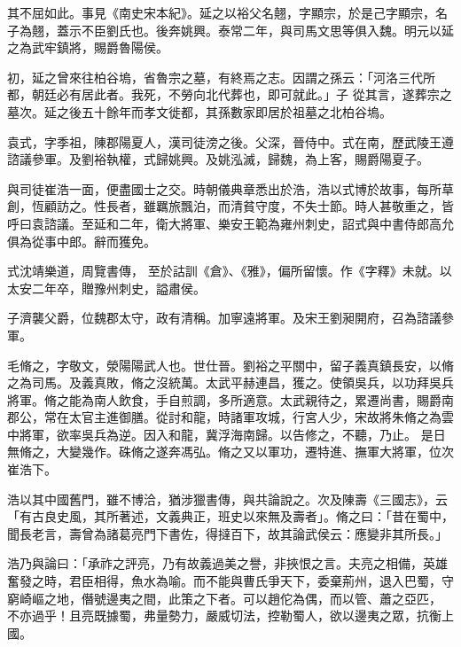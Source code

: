 \begin{pinyinscope}
 其不屈如此。事見《南史宋本紀》。延之以裕父名翹，字顯宗，於是己字顯宗，名子為翹，蓋示不臣劉氏也。後奔姚興。泰常二年，與司馬文思等俱入魏。明元以延之為武牢鎮將，賜爵魯陽侯。



 初，延之曾來往柏谷塢，省魯宗之墓，有終焉之志。因謂之孫云：「河洛三代所都，朝廷必有居此者。我死，不勞向北代葬也，即可就此。」子
 從其言，遂葬宗之墓次。延之後五十餘年而孝文徙都，其孫數家即居於祖墓之北柏谷塢。



 袁式，字季祖，陳郡陽夏人，漢司徒滂之後。父深，晉侍中。式在南，歷武陵王遵諮議參軍。及劉裕執權，式歸姚興。及姚泓滅，歸魏，為上客，賜爵陽夏子。



 與司徒崔浩一面，便盡國士之交。時朝儀典章悉出於浩，浩以式博於故事，每所草創，恆顧訪之。性長者，雖羈旅飄泊，而清貧守度，不失士節。時人甚敬重之，皆呼曰袁諮議。至延和二年，衛大將軍、樂安王範為雍州刺史，詔式與中書侍郎高允俱為從事中郎。辭而獲免。



 式沈靖樂道，周覽書傳，
 至於詁訓《倉》、《雅》，偏所留懷。作《字釋》未就。以太安二年卒，贈豫州刺史，謚肅侯。



 子濟襲父爵，位魏郡太守，政有清稱。加寧遠將軍。及宋王劉昶開府，召為諮議參軍。



 毛脩之，字敬文，滎陽陽武人也。世仕晉。劉裕之平關中，留子義真鎮長安，以脩之為司馬。及義真敗，脩之沒統萬。太武平赫連昌，獲之。使領吳兵，以功拜吳兵將軍。脩之能為南人飲食，手自煎調，多所適意。太武親待之，累遷尚書，賜爵南郡公，常在太官主進御膳。從討和龍，時諸軍攻城，行宮人少，宋故將朱脩之為雲中將軍，欲率吳兵為逆。因入和龍，冀浮海南歸。以告修之，不聽，乃止。
 是日無脩之，大變幾作。硃脩之遂奔馮弘。脩之又以軍功，遷特進、撫軍大將軍，位次崔浩下。



 浩以其中國舊門，雖不博洽，猶涉獵書傳，與共論說之。次及陳壽《三國志》，云「有古良史風，其所著述，文義典正，班史以來無及壽者」。脩之曰：「昔在蜀中，聞長老言，壽曾為諸葛亮門下書佐，得撻百下，故其論武侯云：應變非其所長。」



 浩乃與論曰：「承祚之評亮，乃有故義過美之譽，非挾恨之言。夫亮之相備，英雄奮發之時，君臣相得，魚水為喻。而不能與曹氏爭天下，委棄荊州，退入巴蜀，守窮崎嶇之地，僭號邊夷之間，此策之下者。可以趙佗為偶，而以管、蕭之亞匹，
 不亦過乎！且亮既據蜀，弗量勢力，嚴威切法，控勒蜀人，欲以邊夷之眾，抗衡上國。




\end{pinyinscope}
